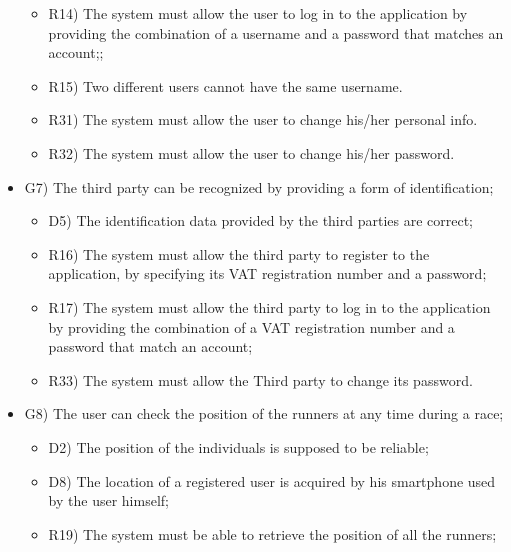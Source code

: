 \documentclass{article}
\begin{document}
\begin{legal}
\begin{legal}
\begin{legal}
\begin{itemize}
{\begin{itemize}
					\item R14) The system must allow the user to log in to the application by providing the combination of a username and a password that matches an account;;\\
					\item R15) Two different users cannot have the same username.\\
					\item R31) The system must allow the user to change his/her personal info.\\
					\item R32) The system must allow the user to change his/her password.\\
					\end{itemize}
				}
				\item G7) The third party can be recognized by providing a form of identification; \\
				{\normalfont
					\begin{itemize}
					\item D5) The identification data provided by the third parties are correct;\\
	 				\item R16) The system must allow the third party to register to the application, by specifying its VAT registration number and a password;\\
					\item R17) The system must allow the third party to log in to the application by providing the combination of a VAT registration number and a password that match an account;\\
					\item R33) The system must allow the Third party to change its password.\\
					\end{itemize}
				}
				\item G8) The user can check the position of the runners at any time during a race;\\
				{\normalfont
					\begin{itemize}
					\item D2) The position of the individuals is supposed to be reliable;\\
					\item D8) The location of a registered user is acquired by his smartphone used by the user himself;\\
	 				\item R19) The system must be able to retrieve the position of all the runners;\\

\end{itemize}}
\end{itemize}
\end{legal}
\end{legal}
\end{legal}
\end{document}
